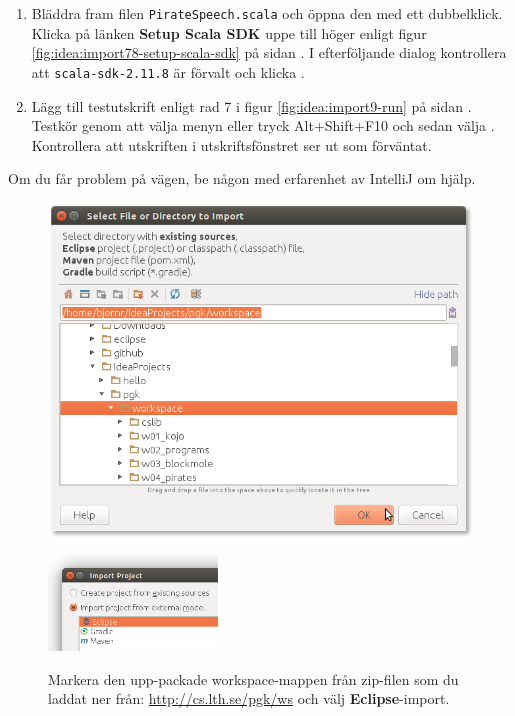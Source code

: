\begin{enumerate}
\item Bläddra fram filen \texttt{PirateSpeech.scala} och öppna den med ett dubbelklick. Klicka på länken \textbf{Setup Scala SDK} uppe till höger enligt figur \ref{fig:idea:import78-setup-scala-sdk} på sidan \pageref{fig:idea:import78-setup-scala-sdk}. I efterföljande dialog kontrollera att \texttt{scala-sdk-2.11.8} är förvalt och klicka .

\item Lägg till testutskrift enligt rad 7 i figur \ref{fig:idea:import9-run} på sidan \pageref{fig:idea:import9-run}. Testkör genom att välja menyn  eller tryck Alt+Shift+F10 och sedan välja . Kontrollera att utskriften i utskriftsfönstret ser ut som förväntat.
\end{enumerate}

\noindent Om du får problem på vägen, be någon med erfarenhet av IntelliJ om hjälp.


{\vfill
\begin{figure}[H]
\centering
\includegraphics[width=1.0\textwidth]{../img/intellij/idea-import2-select.png} 

{\hfill\includegraphics[width=0.4\textwidth]{../img/intellij/idea-import3-eclipse.png}} 

\caption{Markera den upp-packade workspace-mappen från zip-filen som du laddat ner från: \url{http://cs.lth.se/pgk/ws} och välj \textbf{Eclipse}-import.}
\label{fig:idea:import23-select}
\end{figure}
}

